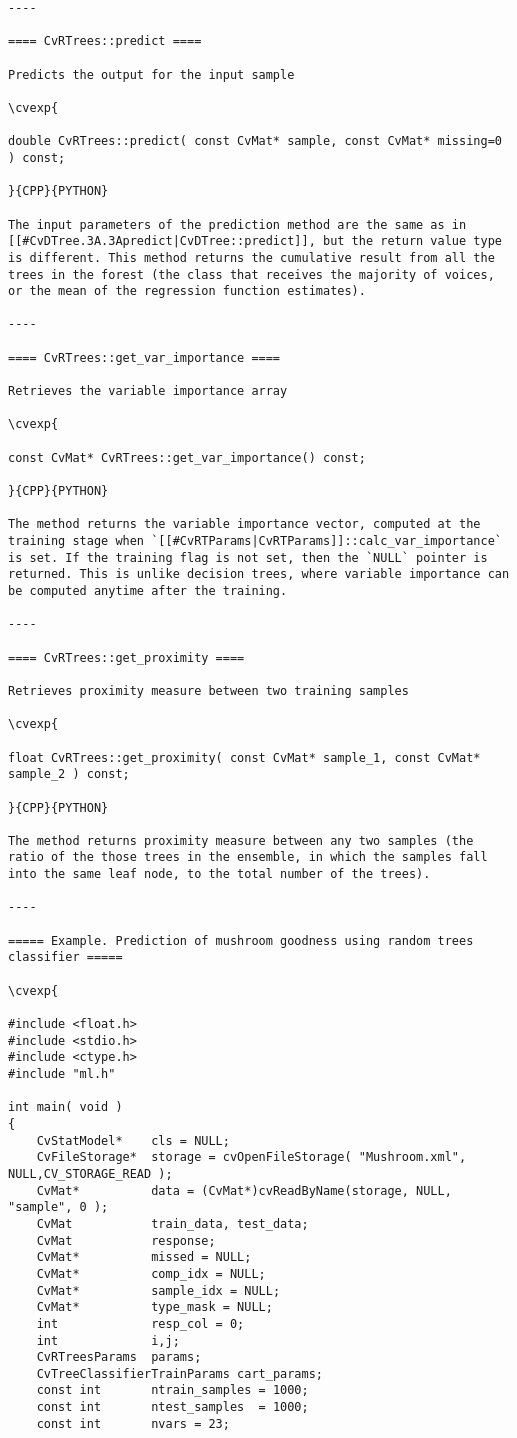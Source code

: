 \begin{verbatim}
----

==== CvRTrees::predict ====

Predicts the output for the input sample

\cvexp{

double CvRTrees::predict( const CvMat* sample, const CvMat* missing=0 ) const;

}{CPP}{PYTHON}

The input parameters of the prediction method are the same as in [[#CvDTree.3A.3Apredict|CvDTree::predict]], but the return value type is different. This method returns the cumulative result from all the trees in the forest (the class that receives the majority of voices, or the mean of the regression function estimates).

----

==== CvRTrees::get_var_importance ====

Retrieves the variable importance array

\cvexp{

const CvMat* CvRTrees::get_var_importance() const;

}{CPP}{PYTHON}

The method returns the variable importance vector, computed at the training stage when `[[#CvRTParams|CvRTParams]]::calc_var_importance` is set. If the training flag is not set, then the `NULL` pointer is returned. This is unlike decision trees, where variable importance can be computed anytime after the training.

----

==== CvRTrees::get_proximity ====

Retrieves proximity measure between two training samples

\cvexp{

float CvRTrees::get_proximity( const CvMat* sample_1, const CvMat* sample_2 ) const;

}{CPP}{PYTHON}

The method returns proximity measure between any two samples (the ratio of the those trees in the ensemble, in which the samples fall into the same leaf node, to the total number of the trees).

----

===== Example. Prediction of mushroom goodness using random trees classifier =====

\cvexp{

#include <float.h>
#include <stdio.h>
#include <ctype.h>
#include "ml.h"

int main( void )
{
    CvStatModel*    cls = NULL;
    CvFileStorage*  storage = cvOpenFileStorage( "Mushroom.xml", NULL,CV_STORAGE_READ );
    CvMat*          data = (CvMat*)cvReadByName(storage, NULL, "sample", 0 );
    CvMat           train_data, test_data;
    CvMat           response;
    CvMat*          missed = NULL;
    CvMat*          comp_idx = NULL;
    CvMat*          sample_idx = NULL;
    CvMat*          type_mask = NULL;
    int             resp_col = 0;
    int             i,j;
    CvRTreesParams  params;
    CvTreeClassifierTrainParams cart_params;
    const int       ntrain_samples = 1000;
    const int       ntest_samples  = 1000;
    const int       nvars = 23;


\end{verbatim}
